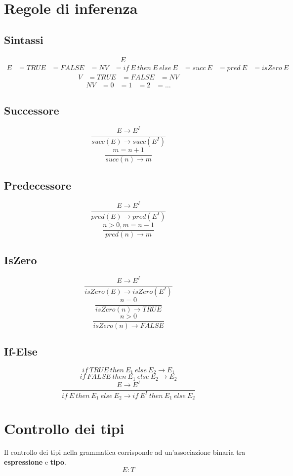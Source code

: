 \documentclass[12pt,a4paper]{article}
\let\oldsection\section
\renewcommand{\section}{\clearpage\oldsection}
\begin{document}
\section{Regole di inferenza}
\subsection{Sintassi}
\[
\begin{aligned}
  E &= 
\end{aligned}
\]
\[
\begin{aligned}
  E &= TRUE
    &= FALSE
    &= NV
    &= if\ E\ then\ E\ else\ E
    &= succ\ E
    &= pred\ E
    &= isZero\ E
\end{aligned}
\]
\[
\begin{aligned}
  V &= TRUE
    &= FALSE
    &= NV
\end{aligned}
\]
\[
\begin{aligned}
  NV &= 0
     &= 1
     &= 2
     &= \dots
\end{aligned}
\]
\subsection{Successore}
\[
\frac{E \rightarrow E^I}{succ(E) \rightarrow succ(E^I)}
\]
\[
\frac{m = n + 1}{succ(n) \rightarrow m}
\]
\subsection{Predecessore}
\[
\frac{E \rightarrow E^I}{pred(E) \rightarrow pred(E^I)}
\]
\[
\frac{n > 0, m = n - 1}{pred(n) \rightarrow m}
\]
\subsection{IsZero}
\[
\frac{E \rightarrow E^I}{isZero(E) \rightarrow isZero(E^I)}
\]
\[
\frac{n = 0}{isZero(n) \rightarrow TRUE}
\]
\[
\frac{n > 0}{isZero(n) \rightarrow FALSE}
\]
\subsection{If-Else}
\[
if\ TRUE\ then\ E_1\ else\ E_2 \rightarrow E_1
\]
\[
if\ FALSE\ then\ E_1\ else\ E_2 \rightarrow E_2
\]
\[
\frac{E \rightarrow E^I}{if\ E\ then\ E_1\ else\ E_2 \rightarrow if\ E^I\ then\ E_1\ else\ E_2}
\]

\section{Controllo dei tipi}
Il controllo dei tipi nella grammatica corrisponde ad un'associazione binaria tra \textbf{espressione} e \textbf{tipo}.
\[
E:T
\]
\end{document}
